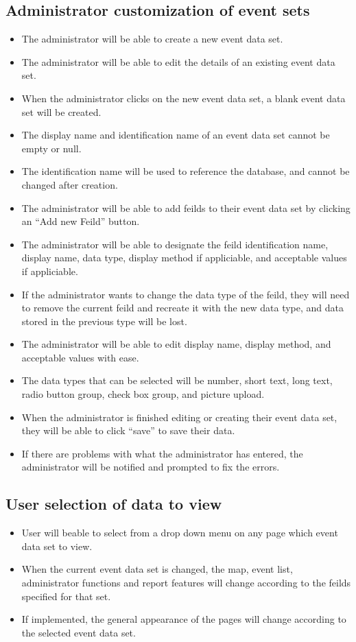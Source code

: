 \subsection{Administrator customization of event sets}
\begin{itemize}
\item The administrator will be able to create a new event data set.
\item The administrator will be able to edit the details of an existing event data set.
\item When the administrator clicks on the new event data set, a blank event data set will be created. 
\item The display name and identification name of an event data set cannot be empty or null.
\item The identification name will be used to reference the database, and cannot be changed after creation.
\item The administrator will be able to add feilds to their event data set by clicking an ``Add new Feild'' button.
\item The administrator will be able to designate the feild identification name, display name, data type, display method if appliciable, and acceptable values if appliciable. 
\item If the administrator wants to change the data type of the feild, they will need to remove the current feild and recreate it with the new data type, and data stored in the previous type will be lost.
\item The administrator will be able to edit display name, display method, and acceptable values with ease.
\item The data types that can be selected will be number, short text, long text, radio button group, check box group, and picture upload.
\item When the administrator is finished editing or creating their event data set, they will be able to click ``save'' to save their data. 
\item If there are problems with what the administrator has entered, the administrator will be notified and prompted to fix the errors.
\end{itemize}

\subsection{User selection of data to view}
\begin{itemize}
\item User will beable to select from a drop down menu on any page which event data set to view. 
\item When the current event data set is changed, the map, event list, administrator functions and report features will change according to the feilds specified for that set.
\item If implemented, the general appearance of the pages will change according to the selected event data set.
\end{itemize}

